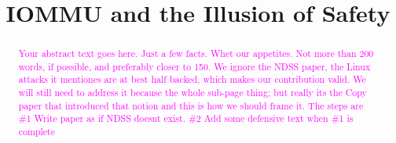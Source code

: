 \usepackage{filecontents}
\providecommand{\shinfo}{\texttt{struct skb\_shared\_info }}
\providecommand{\page}{\texttt{struct page }}
\providecommand{\uarg}{\texttt{uarg }}
\providecommand{\kva}{kva }
\providecommand{\iova}{IOVA }
\providecommand{\mabaf}{malicious buffer }
\providecommand{\spb}{SPB\-2 }


\date{}

\title{\Large \bf IOMMU and the Illusion of Safety}

\begin{comment}
\author{
{\rm Markuze Alex}\\
Technion, VMware Research
\and
{\rm Gil Kupfer}\\
Technion
\and
{\rm Nadav Amit}\\
VMware Research
\and{\rm Dan Tsafrir}\\
Technion, VMware Research
} %
\end{comment}

\maketitle

\begin{abstract}
\textcolor{magenta}{Your abstract text goes here. Just a few facts. Whet our appetites.
Not more than 200 words, if possible, and preferably closer to 150.\newline
We ignore the NDSS paper, the Linux attacks it mentiones are at best half backed, which makes our contribution valid. We will still need to address it because the whole sub-page thing; but really its the Copy paper that introduced that notion and this is how we should frame it. The steps are \#1 Write paper as if NDSS doesnt exist. \#2 Add some defensive text when \#1 is complete}
\end{abstract}


